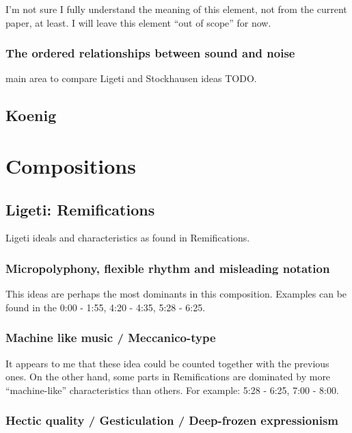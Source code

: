 \documentclass[a4paper,11pt]{article}
\begin{document}
I'm not sure I fully understand the meaning of this element, not from the current paper, at least.
I will leave this element ``out of scope'' for now.

\subsubsection{The ordered relationships between sound and noise}
\label{subs:stockhausen:noise}

main area to compare Ligeti and Stockhausen ideas TODO.

\subsection{Koenig}
\label{sub:eshtetic_koenig}

\section{Compositions}
\label{sec:compositions}

\subsection{Ligeti: Remifications}
\label{sub:composition_ligeti}

Ligeti ideals and characteristics as found in Remifications.

\subsubsection{Micropolyphony, flexible rhythm and misleading notation}

This ideas are perhaps the most dominants in this composition.
Examples can be found in the 0:00 - 1:55, 4:20 - 4:35, 5:28 - 6:25.

\subsubsection{Machine like music / Meccanico-type}

It appears to me that these idea could be counted together with the previous ones.
On the other hand, some parts in Remifications are dominated by more ``machine-like'' characteristics than others.
For example: 5:28 - 6:25, 7:00 - 8:00.

\subsubsection{Hectic quality / Gesticulation / Deep-frozen expressionism}
\end{document}
